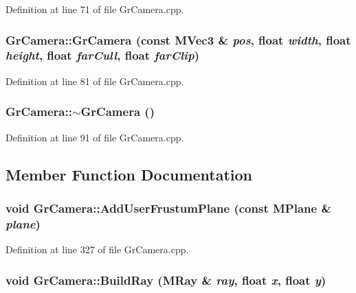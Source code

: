Definition at line 71 of file GrCamera.cpp.\hypertarget{class_gr_camera_f5b22b62e8bc91b53d64080b65a0ec68}{
\subsubsection[{GrCamera}]{\setlength{\rightskip}{0pt plus 5cm}GrCamera::GrCamera (const {\bf MVec3} \& {\em pos}, \/  float {\em width}, \/  float {\em height}, \/  float {\em farCull}, \/  float {\em farClip})}}
\label{class_gr_camera_f5b22b62e8bc91b53d64080b65a0ec68}




Definition at line 81 of file GrCamera.cpp.\hypertarget{class_gr_camera_43ac986a04d8a1c7c993344f190b230f}{
\subsubsection[{$\sim$GrCamera}]{\setlength{\rightskip}{0pt plus 5cm}GrCamera::$\sim$GrCamera ()}}
\label{class_gr_camera_43ac986a04d8a1c7c993344f190b230f}




Definition at line 91 of file GrCamera.cpp.

\subsection{Member Function Documentation}
\hypertarget{class_gr_camera_1b10bccef56e0cc3072df740388adc71}{
\subsubsection[{AddUserFrustumPlane}]{\setlength{\rightskip}{0pt plus 5cm}void GrCamera::AddUserFrustumPlane (const {\bf MPlane} \& {\em plane})}}
\label{class_gr_camera_1b10bccef56e0cc3072df740388adc71}




Definition at line 327 of file GrCamera.cpp.\hypertarget{class_gr_camera_3f8fbce375833a8c7e183c6a30f2e9f6}{
\subsubsection[{BuildRay}]{\setlength{\rightskip}{0pt plus 5cm}void GrCamera::BuildRay ({\bf MRay} \& {\em ray}, \/  float {\em x}, \/  float {\em y})}}
\label{class_gr_camera_3f8fbce375833a8c7e183c6a30f2e9f6}





